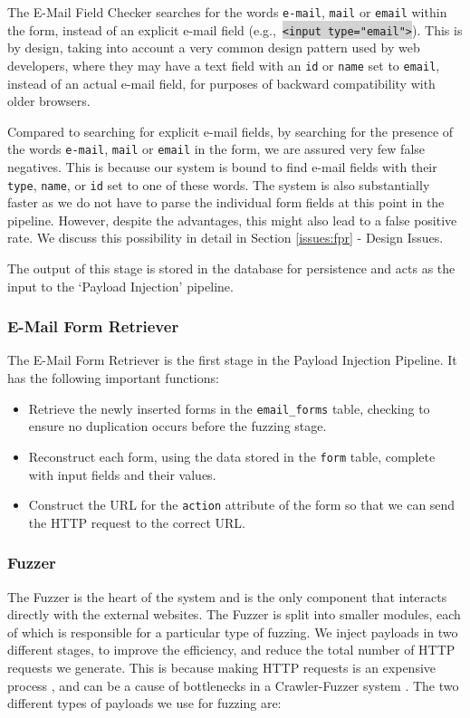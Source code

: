 The E-Mail Field Checker searches for the words \texttt{e-mail}, \texttt{mail} or \texttt{email} within the form, instead of an explicit e-mail field (e.g.,\ \colorbox{lightgray}{\lstinline{<input type="email">}}). This is by design, taking into account a very common design pattern used by web developers, where they may have a text field with an \texttt{id} or \texttt{name} set to \texttt{email}, instead of an actual e-mail field, for purposes of backward compatibility with older browsers.

Compared to searching for explicit e-mail fields, by searching for the presence of the words \texttt{e-mail}, \texttt{mail} or \texttt{email} in the form, we are assured very few false negatives. This is because our system is bound to find e-mail fields with their \texttt{type}, \texttt{name}, or \texttt{id} set to one of these words. The system is also substantially faster as we do not have to parse the individual form fields at this point in the pipeline. However, despite the advantages, this might also lead to a false positive rate. We discuss this possibility in detail in Section \ref*{issues:fpr} - Design Issues. 

The output of this stage is stored in the database for persistence and acts as the input to the `Payload Injection' pipeline.


\subsubsection{E-Mail Form Retriever}
\label{Comp:EMFR}
The E-Mail Form Retriever is the first stage in the Payload Injection Pipeline. It has the following important functions:
\begin{itemize}
	\item Retrieve the newly inserted forms in the \texttt{email\_forms} table, checking to ensure no duplication occurs before the fuzzing stage.
	\item Reconstruct each form, using the data stored in the \texttt{form} table, complete with input fields and their values.
	\item Construct the URL for the \texttt{action} attribute of the form so that we can send the HTTP request to the correct URL. 
\end{itemize}

\subsubsection{Fuzzer}
\label{Comp:Fuzzer}
The Fuzzer is the heart of the system and is the only component that interacts directly with the external websites. The Fuzzer is split into smaller modules, each of which is responsible for a particular type of fuzzing.  We inject payloads in two different stages, to improve the efficiency, and reduce the total number of HTTP requests we generate. This is because making HTTP requests is an expensive process \cite{McGrath2009}, and can be a cause of bottlenecks in a Crawler-Fuzzer system \cite{ShkapenyukTorstenSuel2001}.
The two different types of payloads we use for fuzzing are:
